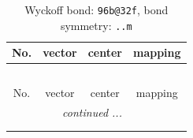 \documentclass[fleqn,8pt]{jsarticle}
\begin{document}
\renewcommand{\arraystretch}{1.2}
\begin{longtable}{cccc}
\caption{Wyckoff bond: {\tt 96b@32f}, bond symmetry: {\tt ..m}}
 \\
 \hline \hline
No. & vector & center & mapping \\ \hline \endfirsthead

\multicolumn{3}{l}{\tablename\ \thetable{}} \\
 \hline \hline
No. & vector & center & mapping \\ \hline \endhead

 \hline \hline
\multicolumn{3}{r}{\footnotesize\it continued ...} \\ \endfoot

 \hline \hline
\multicolumn{3}{r}{} \\ \endlastfoot


\end{longtable}
\end{document}
